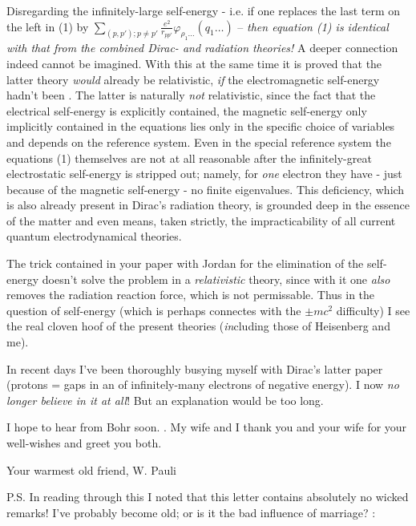 \documentclass{article}
\newcommand{\sumX}[1]{\underset{#1}{\sum}}
\begin{document}
Disregarding the infinitely-large self-energy - i.e. if one replaces the last term on the left in (1) by $\sumX{(p,p'); p \neq p'}\frac{e^2}{r_{pp'}}\varphi_{\rho_1 \dots}(q_1 \dots)$ -- \textit{then equation (1) is identical with that from the combined Dirac- and radiation theories!} A deeper connection indeed cannot be imagined. With this at the same time it is proved that the latter theory \textit{would} already be relativistic, \textit{if} the electromagnetic self-energy hadn't been . The latter is naturally \textit{not} relativistic, since the fact that the electrical self-energy is explicitly contained, the magnetic self-energy only implicitly contained in the equations lies only in the specific choice of variables and depends on the reference system.
Even in the special reference system the equations (1) themselves are not at all reasonable after the infinitely-great electrostatic self-energy is stripped out; namely, for \textit{one} electron they have - just because of the magnetic self-energy - no finite eigenvalues. This deficiency, which is also already present in Dirac's radiation theory, is grounded deep in the essence of the matter and even means, taken strictly, the impracticability of all current quantum electrodynamical theories.

The trick contained in your paper with Jordan for the elimination of the self-energy doesn't solve the problem in a \textit{relativistic} theory, since with it one \textit{also} removes the radiation reaction force, which is not permissable. Thus in the question of self-energy (which is perhaps connectes with the $\pm mc^2$ difficulty) I see the real cloven hoof of the present theories (\textit{in}cluding those of Heisenberg and me).

In recent days I've been thoroughly busying myself with Dirac's latter paper (protons = gaps in an  of infinitely-many electrons of negative energy). I now \textit{no longer believe in it at all}! But an explanation would be too long.

I hope to hear from Bohr soon. . My wife and I thank you and your wife for your well-wishes and greet you both.

Your warmest old friend,
W. Pauli

P.S. In reading through this I noted that this letter contains absolutely no wicked remarks! I've probably become old; or is it the bad influence of marriage? :
\end{document}
